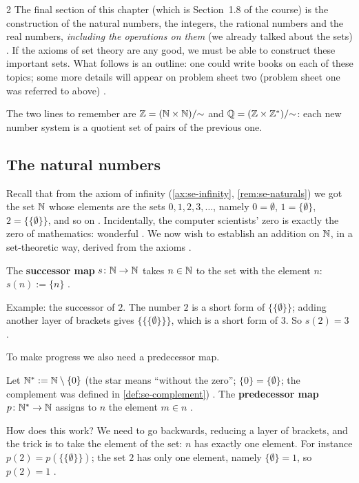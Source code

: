 \begin{paracol}{2}
The final section of this chapter (which is Section~1.8 of the course) is the construction of the natural numbers, the
integers, the rational numbers and the real numbers, \emph{including the operations on them} (we already talked about
the sets) . If the axioms of set theory are any good, we must be able to construct these
important sets. What follows is an outline: one could write books on each of these topics; some more details will appear on
problem sheet two (problem sheet one was referred to above) .

The two lines to remember are $\mathbb Z=(\mathbb{N}\times\mathbb{N})/{\sim}$ and $\mathbb{Q}=(\mathbb Z\times\mathbb Z^*)/{\sim}$: each new number
system is a quotient set of pairs of the previous one.

\subsection*{The natural numbers}

Recall that from the axiom of infinity (\cref{ax:se-infinity}, \cref{rem:se-naturals}) we got the set $\mathbb{N}$ whose elements are
the sets $0,1,2,3,\dots$, namely $0=\emptyset$, $1=\{\emptyset\}$, $2=\{\{\emptyset\}\}$, and so on .
Incidentally, the computer scientists' zero is exactly the zero of mathematics: wonderful . We now wish to
establish an addition on $\mathbb{N}$, in a set-theoretic way, derived from the axioms .

\begin{definition}\label{def:cl-succ}
The \textbf{successor map} $s\colon\mathbb{N}\to\mathbb{N}$ takes $n\in\mathbb{N}$ to the set with the element $n$: $s(n):=\{n\}$
.
\end{definition}
Example: the successor of $2$. The number $2$ is a short form of $\{\{\emptyset\}\}$; adding another layer of brackets
gives $\{\{\{\emptyset\}\}\}$, which is a short form of $3$. So $s(2)=3$ .

To make progress we also need a predecessor map.

\begin{definition}\label{def:cl-pred}
Let $\mathbb{N}^*:=\mathbb{N}\setminus\{0\}$ (the star means ``without the zero''; $\{0\}=\{\emptyset\}$; the complement was defined in
\cref{def:se-complement}) . The \textbf{predecessor map}
$p\colon\mathbb{N}^*\to\mathbb{N}$ assigns to $n$ the element $m\in n$ .
\end{definition}
How does this work? We need to go backwards, reducing a layer of brackets, and the trick is to take the element of the
set: $n$ has exactly one element. For instance $p(2)=p(\{\{\emptyset\}\})$; the set $2$ has only one element, namely
$\{\emptyset\}=1$, so $p(2)=1$ .


\end{paracol}
